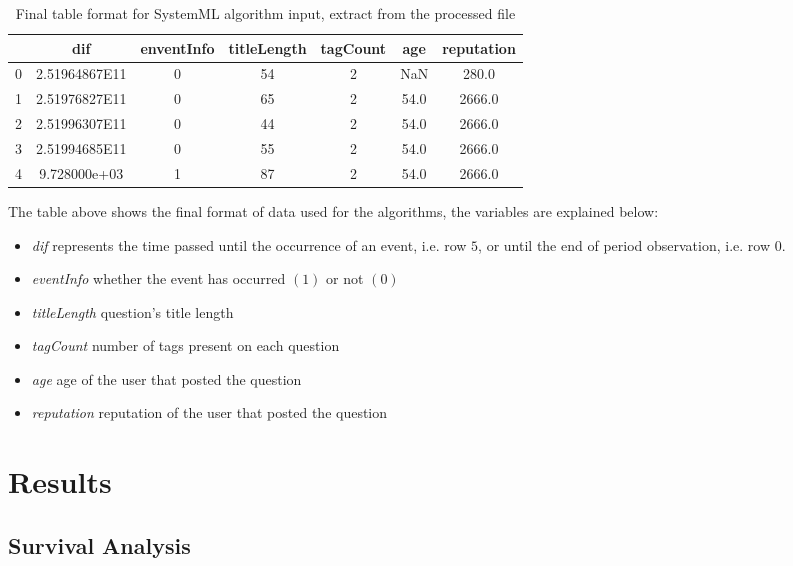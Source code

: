 \documentclass[11pt]{book} %
\begin{document}
    \begin{table}[!ht]
      \centering
      \begin{tabular}{|c|c|c|c|c|c|c|}
        \hline
           & dif & enventInfo & titleLength & tagCount & age & reputation \\ \hline
          0 & 2.51964867E11 & 0   & 54  & 2 & NaN & 280.0 \\ \hline
          1 & 2.51976827E11 & 0   & 65  & 2 & 54.0 & 2666.0 \\ \hline
          2 & 2.51996307E11 & 0   & 44  & 2 & 54.0 & 2666.0 \\ \hline
          3 & 2.51994685E11 & 0   & 55  & 2 & 54.0 & 2666.0 \\ \hline
          4 & 9.728000e+03  & 1   & 87	& 2	& 54.0 & 2666.0 \\ \hline
      \end{tabular}
      \caption{Final table format for SystemML algorithm input, extract from the processed file}
      \label{tab:final_table_format}
    \end{table}

    The table above shows the final format of data used for the algorithms, the variables are explained below:
    \begin{itemize}
      \item \emph{dif} represents the time passed until the occurrence of an event, i.e. row $5$, or until the end of period observation, i.e. row $0$.
      \item \emph{eventInfo} whether the event has occurred $(1)$ or not $(0)$
      \item \emph{titleLength} question's title length
      \item \emph{tagCount} number of tags present on each question
      \item \emph{age} age of the user that posted the question
      \item \emph{reputation} reputation of the user that posted the question
    \end{itemize}

\chapter{Results}
  \label{sec:results}

  \section{Survival Analysis}
\end{document}
